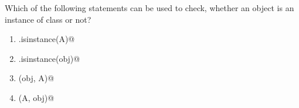 \question
Which of the following statements can be used to check, whether an object \lstinline@obj@ is an instance of class \lstinline@A@ or not?
\begin{enumerate}
\item \lstinline@obj.isinstance(A)@
\item \lstinline@A.isinstance(obj)@
\item \lstinline@isinstance(obj, A)@
\item \lstinline@isinstance(A, obj)@
\end{enumerate}

